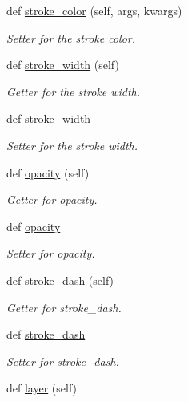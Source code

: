 \begin{DoxyCompactItemize}
def \hyperlink{classbridges_1_1symbol_1_1_symbol_a4b90f8a3ebbf1bd8586d970e796a2401}{stroke\+\_\+color} (self, args, kwargs)
\begin{DoxyCompactList}\small\item\em Setter for the stroke color. \end{DoxyCompactList}\item 
def \hyperlink{classbridges_1_1symbol_1_1_symbol_a4da625974fcb3ac83a60489a7c059c10}{stroke\+\_\+width} (self)
\begin{DoxyCompactList}\small\item\em Getter for the stroke width. \end{DoxyCompactList}\item 
def \hyperlink{classbridges_1_1symbol_1_1_symbol_a85c961221005786cd8f5b31fec3fd8d2}{stroke\+\_\+width}
\begin{DoxyCompactList}\small\item\em Setter for the stroke width. \end{DoxyCompactList}\item 
def \hyperlink{classbridges_1_1symbol_1_1_symbol_a332e9461ed001268a100af2ad5a535e9}{opacity} (self)
\begin{DoxyCompactList}\small\item\em Getter for opacity. \end{DoxyCompactList}\item 
def \hyperlink{classbridges_1_1symbol_1_1_symbol_afea86f6d7c341168810c09159780ea83}{opacity}
\begin{DoxyCompactList}\small\item\em Setter for opacity. \end{DoxyCompactList}\item 
def \hyperlink{classbridges_1_1symbol_1_1_symbol_aeb388cf5a368e58ea10ecdd2ad7d3c10}{stroke\+\_\+dash} (self)
\begin{DoxyCompactList}\small\item\em Getter for stroke\+\_\+dash. \end{DoxyCompactList}\item 
def \hyperlink{classbridges_1_1symbol_1_1_symbol_a1163b25841477c2fda6368fc05f4f79d}{stroke\+\_\+dash}
\begin{DoxyCompactList}\small\item\em Setter for stroke\+\_\+dash. \end{DoxyCompactList}\item 
def \hyperlink{classbridges_1_1symbol_1_1_symbol_a87aeef3f7fde1b8047983ca344283507}{layer} (self)

\end{DoxyCompactItemize}
